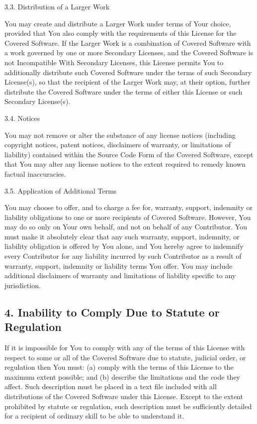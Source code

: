 \documentclass[letterpaper,10pt,english]{sphinxmanual}
\begin{document}
3.3. Distribution of a Larger Work

You may create and distribute a Larger Work under terms of Your choice,
provided that You also comply with the requirements of this License for
the Covered Software. If the Larger Work is a combination of Covered
Software with a work governed by one or more Secondary Licenses, and the
Covered Software is not Incompatible With Secondary Licenses, this
License permits You to additionally distribute such Covered Software
under the terms of such Secondary License(s), so that the recipient of
the Larger Work may, at their option, further distribute the Covered
Software under the terms of either this License or such Secondary
License(s).

3.4. Notices

You may not remove or alter the substance of any license notices
(including copyright notices, patent notices, disclaimers of warranty,
or limitations of liability) contained within the Source Code Form of
the Covered Software, except that You may alter any license notices to
the extent required to remedy known factual inaccuracies.

3.5. Application of Additional Terms

You may choose to offer, and to charge a fee for, warranty, support,
indemnity or liability obligations to one or more recipients of Covered
Software. However, You may do so only on Your own behalf, and not on
behalf of any Contributor. You must make it absolutely clear that any
such warranty, support, indemnity, or liability obligation is offered by
You alone, and You hereby agree to indemnify every Contributor for any
liability incurred by such Contributor as a result of warranty, support,
indemnity or liability terms You offer. You may include additional
disclaimers of warranty and limitations of liability specific to any
jurisdiction.


\subsection{4. Inability to Comply Due to Statute or Regulation}
\label{\detokenize{warranty:inability-to-comply-due-to-statute-or-regulation}}
If it is impossible for You to comply with any of the terms of this
License with respect to some or all of the Covered Software due to
statute, judicial order, or regulation then You must: (a) comply with
the terms of this License to the maximum extent possible; and (b)
describe the limitations and the code they affect. Such description must
be placed in a text file included with all distributions of the Covered
Software under this License. Except to the extent prohibited by statute
or regulation, such description must be sufficiently detailed for a
recipient of ordinary skill to be able to understand it.
\end{document}
